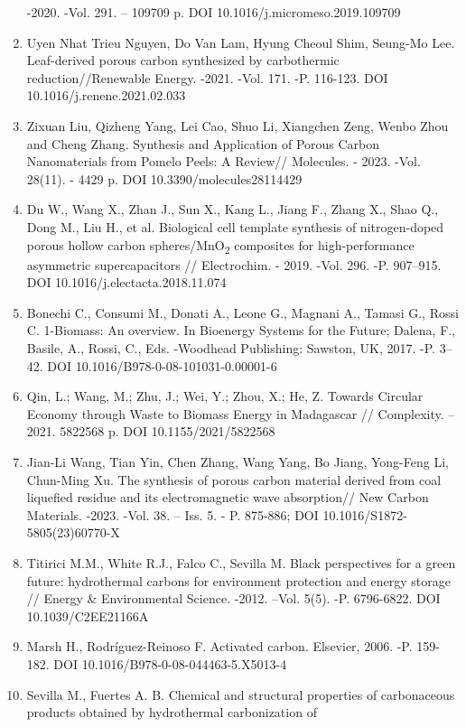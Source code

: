 \begin{enumerate}
  -2020. -Vol. 291. -- 109709 p. DOI 10.1016/j.micromeso.2019.109709
\item
  Uyen Nhat Trieu Nguyen, Do Van Lam, Hyung Cheoul Shim, Seung-Mo Lee.
  Leaf-derived porous carbon synthesized by carbothermic
  reduction//Renewable Energy. -2021. -Vol. 171. -P. 116-123. DOI
  10.1016/j.renene.2021.02.033
\item
  Zixuan Liu, Qizheng Yang, Lei Cao, Shuo Li, Xiangchen Zeng, Wenbo Zhou
  and Cheng Zhang. Synthesis and Application of Porous Carbon
  Nanomaterials from Pomelo Peels: A Review// Molecules. - 2023. -Vol.
  28(11). - 4429 p. DOI 10.3390/molecules28114429
\item
  Du W., Wang X., Zhan J., Sun X., Kang L., Jiang F., Zhang X., Shao Q.,
  Dong M., Liu H., et al. Biological cell template synthesis of
  nitrogen-doped porous hollow carbon spheres/MnO\textsubscript{2}
  composites for high-performance asymmetric supercapacitors //
  Electrochim. - 2019. -Vol. 296. -P. 907--915. DOI
  10.1016/j.electacta.2018.11.074
\item
  Bonechi C., Consumi M., Donati A., Leone G., Magnani A., Tamasi G.,
  Rossi C. 1-Biomass: An overview. In Bioenergy Systems for the Future;
  Dalena, F., Basile, A., Rossi, C., Eds. -Woodhead Publishing: Sawston,
  UK, 2017. -P. 3--42. DOI 10.1016/B978-0-08-101031-0.00001-6
\item
  Qin, L.; Wang, M.; Zhu, J.; Wei, Y.; Zhou, X.; He, Z. Towards Circular
  Economy through Waste to Biomass Energy in Madagascar // Complexity.
  -- 2021. 5822568 p. DOI 10.1155/2021/5822568
\item
  Jian-Li Wang, Tian Yin, Chen Zhang, Wang Yang, Bo Jiang, Yong-Feng Li,
  Chun-Ming Xu. The synthesis of porous carbon material derived from
  coal liquefied residue and its electromagnetic wave absorption// New
  Carbon Materials. -2023. -Vol. 38. -- Iss. 5. - P. 875-886; DOI
  10.1016/S1872-5805(23)60770-X
\item
  Titirici M.M., White R.J., Falco C., Sevilla M. Black perspectives for
  a green future: hydrothermal carbons for environment protection and
  energy storage // Energy \& Environmental Science. -2012. --Vol. 5(5).
  -P. 6796-6822. DOI 10.1039/C2EE21166A
\item
  Marsh H., Rodríguez-Reinoso F. Activated carbon. Elsevier, 2006. -P.
  159-182. DOI 10.1016/B978-0-08-044463-5.X5013-4
\item
  Sevilla M., Fuertes A. B. Chemical and structural properties of
  carbonaceous products obtained by hydrothermal carbonization of

\end{enumerate}
